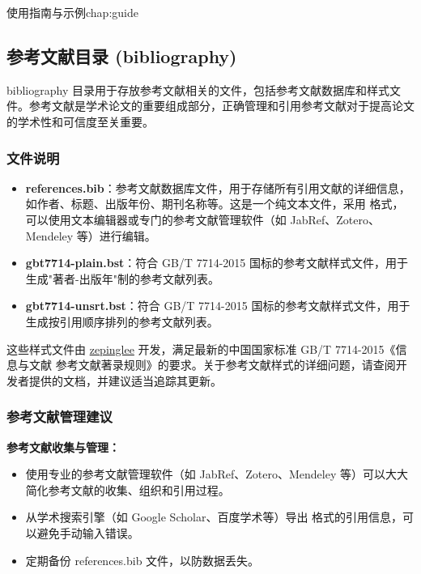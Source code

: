 \begin{cuzchapter}{使用指南与示例}{chap:guide}
    \subsection{参考文献目录 (bibliography)}\label{sub:bibliography}

    bibliography 目录用于存放参考文献相关的文件，包括参考文献数据库和样式文件。参考文献是学术论文的重要组成部分，正确管理和引用参考文献对于提高论文的学术性和可信度至关重要。

    \subsubsection{文件说明}\label{subsub:bibliography-files}

    \begin{itemize}
        \item \textbf{references.bib}：参考文献数据库文件，用于存储所有引用文献的详细信息，如作者、标题、出版年份、期刊名称等。这是一个纯文本文件，采用  格式，可以使用文本编辑器或专门的参考文献管理软件（如 JabRef、Zotero、Mendeley 等）进行编辑。

        \item \textbf{gbt7714-plain.bst}：符合 GB/T 7714-2015 国标的参考文献样式文件，用于生成"著者-出版年"制的参考文献列表。

        \item \textbf{gbt7714-unsrt.bst}：符合 GB/T 7714-2015 国标的参考文献样式文件，用于生成按引用顺序排列的参考文献列表。
    \end{itemize}

    这些样式文件由 \href{https://github.com/zepinglee/gbt7714-bibtex-style}{zepinglee} 开发，满足最新的中国国家标准 GB/T 7714-2015《信息与文献 参考文献著录规则》的要求。关于参考文献样式的详细问题，请查阅开发者提供的文档，并建议适当追踪其更新。

    \subsubsection{参考文献管理建议}\label{subsub:bibliography-management}

    \begin{leftbar}
        \noindent\textbf{参考文献收集与管理：}
        \begin{itemize}
            \item 使用专业的参考文献管理软件（如 JabRef、Zotero、Mendeley 等）可以大大简化参考文献的收集、组织和引用过程。
            \item 从学术搜索引擎（如 Google Scholar、百度学术等）导出  格式的引用信息，可以避免手动输入错误。
            \item 定期备份 references.bib 文件，以防数据丢失。
        \end{itemize}


\end{leftbar}
\end{cuzchapter}
